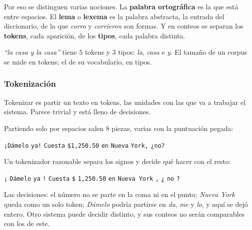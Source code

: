 \documentclass[11pt,letterpaper]{article}
\begin{document}
Por eso se distinguen varias nociones. La \textbf{palabra
ortográfica} es la que está entre espacios. El \textbf{lema} o
\textbf{lexema} es la palabra abstracta, la entrada del diccionario,
de la que \textit{corro} y \textit{corrieron} son formas. Y en
conteos se separan los \textbf{tokens}, cada aparición, de los
\textbf{tipos}, cada palabra distinta.

\begin{ejemplo}
    \textit{``la casa y la casa''} tiene $5$ tokens y $3$ tipos:
    \textit{la}, \textit{casa} e \textit{y}. El tamaño de un corpus se
    mide en tokens; el de su vocabulario, en tipos.
\end{ejemplo}

\subsubsection*{Tokenización}

Tokenizar es partir un texto en tokens, las unidades con las que va a
trabajar el sistema. Parece trivial y está lleno de decisiones.

\begin{ejemplo}
    Partiendo solo por espacios salen $8$ piezas, varias con la
    puntuación pegada:
    \begin{center}
    \small
    \texttt{¡Dámelo} \quad \texttt{ya!} \quad \texttt{Cuesta} \quad
    \texttt{\$1,250.50} \quad \texttt{en} \quad \texttt{Nueva} \quad
    \texttt{York,} \quad \texttt{¿no?}
    \end{center}
    Un tokenizador razonable separa los signos y decide qué hacer con
    el resto:
    \begin{center}
    \small
    \texttt{¡} \quad \texttt{Dámelo} \quad \texttt{ya} \quad
    \texttt{!} \quad \texttt{Cuesta} \quad \texttt{\$} \quad
    \texttt{1,250.50} \quad \texttt{en} \quad \texttt{Nueva York}
    \quad \texttt{,} \quad \texttt{¿} \quad \texttt{no} \quad
    \texttt{?}
    \end{center}
    Las decisiones: el número no se parte en la coma ni en el punto;
    \textit{Nueva York} queda como un solo token; \textit{Dámelo}
    podría partirse en \textit{da}, \textit{me} y \textit{lo}, y aquí
    se dejó entero. Otro sistema puede decidir distinto, y sus conteos
    no serán comparables con los de este.
\end{ejemplo}

\end{document}
